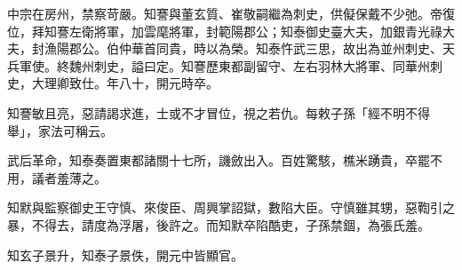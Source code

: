 \begin{pinyinscope}
 中宗在房州，禁察苛嚴。知謇與董玄質、崔敬嗣繼為刺史，供儗保戴不少弛。帝復位，拜知謇左衛將軍，加雲麾將軍，封範陽郡公；知泰御史臺大夫，加銀青光祿大夫，封漁陽郡公。伯仲華首同貴，時以為榮。知泰忤武三思，故出為並州刺史、天兵軍使。終魏州刺史，謚曰定。知謇歷東都副留守、左右羽林大將軍、同華州刺史，大理卿致仕。年八十，開元時卒。



 知謇敏且亮，惡請謁求進，士或不才冒位，視之若仇。每敕子孫「經不明不得舉」，家法可稱云。



 武后革命，知泰奏置東都諸關十七所，譏斂出入。百姓驚駭，樵米踴貴，卒罷不用，議者羞薄之。



 知默與監察御史王守慎、來俊臣、周興掌詔獄，數陷大臣。守慎雖其甥，惡鞫引之暴，不得去，請度為浮屠，後許之。而知默卒陷酷吏，子孫禁錮，為張氏羞。



 知玄子景升，知泰子景佚，開元中皆顯官。



\end{pinyinscope}
